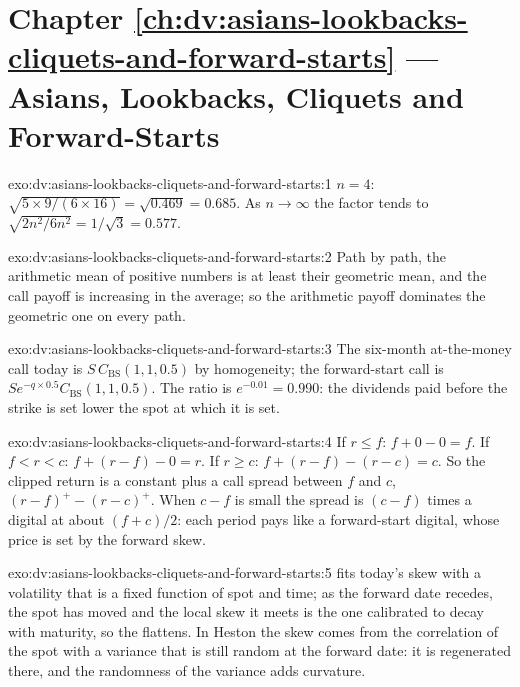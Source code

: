 \section*{Chapter \ref{ch:dv:asians-lookbacks-cliquets-and-forward-starts} --- Asians, Lookbacks, Cliquets and Forward-Starts}

\begin{solution}{exo:dv:asians-lookbacks-cliquets-and-forward-starts:1}
$n=4$: $\sqrt{5\times9/(6\times16)}=\sqrt{0.469}=0.685$. As $n\to\infty$ the factor tends to $\sqrt{2n^2/6n^2}=1/\sqrt3=0.577$.
\end{solution}

\begin{solution}{exo:dv:asians-lookbacks-cliquets-and-forward-starts:2}
Path by path, the arithmetic mean of positive numbers is at least their geometric mean, and the call payoff is increasing
in the average; so the arithmetic payoff dominates the geometric one on every path.
\end{solution}

\begin{solution}{exo:dv:asians-lookbacks-cliquets-and-forward-starts:3}
The six-month at-the-money call today is $S\,C_{\mathrm{BS}}(1,1,0.5)$ by homogeneity; the forward-start call is
$Se^{-q\times0.5}C_{\mathrm{BS}}(1,1,0.5)$. The ratio is $e^{-0.01}=0.990$: the dividends paid before the strike is set lower
the spot at which it is set.
\end{solution}

\begin{solution}{exo:dv:asians-lookbacks-cliquets-and-forward-starts:4}
If $r\le f$: $f+0-0=f$. If $f<r<c$: $f+(r-f)-0=r$. If $r\ge c$: $f+(r-f)-(r-c)=c$. So the clipped return is a constant plus a
call spread between $f$ and $c$, $(r-f)^+-(r-c)^+$. When $c-f$ is small the spread is $(c-f)$ times a digital at about
$(f+c)/2$: each period pays like a forward-start digital, whose price is set by the forward skew.
\end{solution}

\begin{solution}{exo:dv:asians-lookbacks-cliquets-and-forward-starts:5}
 fits today's skew with a volatility that is a fixed function of spot and time; as the forward date
recedes, the spot has moved and the local skew it meets is the one calibrated to decay with maturity, so the  flattens. In Heston the skew comes from the correlation of the spot with a variance that is still random at the
forward date: it is regenerated there, and the randomness of the variance adds curvature.
\end{solution}

